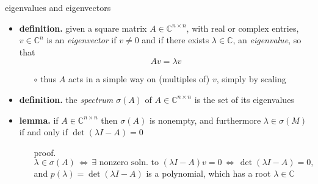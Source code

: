 \documentclass[10pt,hyperref]{beamer}
\newcommand{\CC}{\mathbb{C}}
\begin{document}
\begin{frame}{eigenvalues and eigenvectors}

\begin{itemize}
\item \textbf{definition.}  given a square matrix $A \in \CC^{n\times n}$, with real or complex entries, $v\in\CC^n$ is an \emph{eigenvector} if $v\ne 0$ and if there exists $\lambda\in \CC$, an \emph{eigenvalue}, so that
    $$A v = \lambda v$$

    \begin{itemize}
    \item[$\circ$] thus $A$ acts in a simple way on (multiples of) $v$, simply by scaling
    \end{itemize}
\item \textbf{definition.}  the \emph{spectrum} $\sigma(A)$ of $A \in \CC^{n\times n}$ is the set of its eigenvalues
\item \textbf{lemma.} if $A \in \CC^{n\times n}$ then $\sigma(A)$ is nonempty, and furthermore $\lambda\in\sigma(M)$ if and only if $\det(\lambda I - A)=0$
    \begin{itemize}
    \item[proof.] 
   $$\lambda\in\sigma(A) \, \iff \, \exists \text{ nonzero soln.~to } (\lambda I - A) v = 0 \, \iff \, \det(\lambda I - A)=0,$$
and $p(\lambda) = \det(\lambda I - A)$ is a polynomial, which has a root $\lambda\in\CC$
    \end{itemize}
\end{itemize}
\end{frame}
\end{document}
